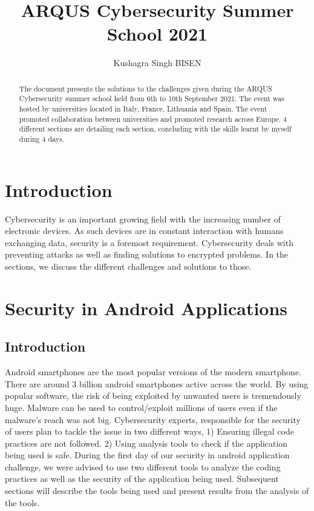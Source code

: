 \documentclass[runningheads]{llncs}
\begin{document}
%
\title{ARQUS Cybersecurity Summer School 2021}
%
%
\author{Kushagra Singh BISEN}
%
%
%
\maketitle              %
%
\begin{abstract}
The document presents the solutions to the challenges given during the ARQUS Cybersecurity summer school held
from 6th to 10th September 2021. The event was hosted by universities located in Italy, France, Lithuania and Spain.
The event promoted collaboration between universities and promoted research across Europe. 4 different sections are detailing each section, concluding with the skills learnt by myself during 4 days.
\end{abstract}

\section{Introduction}
Cybersecurity is an important growing field with the increasing number of electronic devices. As such devices are in constant interaction with humans exchanging data, security is a foremost requirement. Cybersecurity deals with preventing attacks as well as finding solutions to
encrypted problems. In the sections, we discuss the different challenges and solutions to those.

\section{Security in Android Applications}
\subsection{Introduction}
Android smartphones are the most popular versions of the modern smartphone. There are around 3 billion android smartphones active across the world. By using popular software, the risk of being exploited by unwanted users is tremendously huge. Malware can be used to control/exploit millions of users even if the malware's
reach was not big. Cybersecurity experts, responsible for the security of users plan to tackle the issue in two different ways,
1) Ensuring illegal code practices are not followed. 2) Using analysis tools to check if the application being used is safe. During the first day of our security in android application challenge, we were advised to use two different tools to analyze the coding practices as well as the security of the application being used. Subsequent sections will describe the tools being used and present results from the analysis of the tools.
\end{document}
